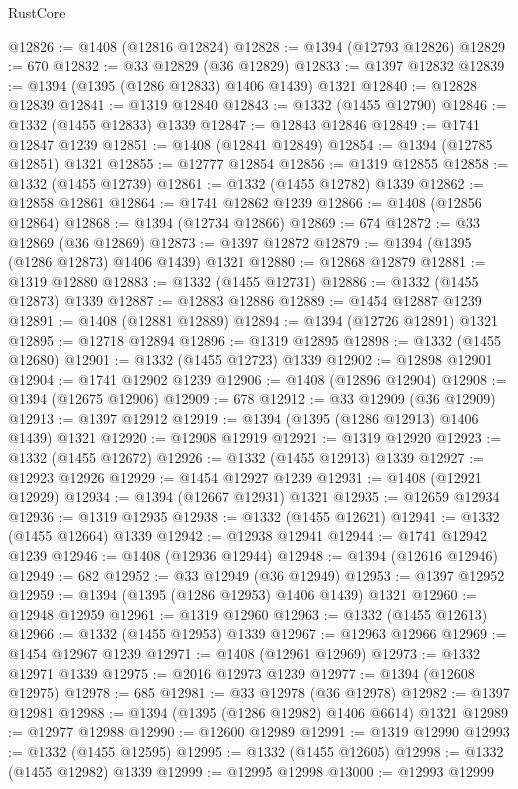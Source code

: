 \begin{lexlean}{RustCore}
\begin{coremodule}
@12826 := @1408 (@12816 @12824)
@12828 := @1394 (@12793 @12826)
@12829 := 670
@12832 := @33 @12829 (@36 @12829)
@12833 := @1397 @12832
@12839 := @1394 (@1395 (@1286 @12833) @1406 @1439) @1321
@12840 := @12828 @12839
@12841 := @1319 @12840
@12843 := @1332 (@1455 @12790)
@12846 := @1332 (@1455 @12833) @1339
@12847 := @12843 @12846
@12849 := @1741 @12847 @1239
@12851 := @1408 (@12841 @12849)
@12854 := @1394 (@12785 @12851) @1321
@12855 := @12777 @12854
@12856 := @1319 @12855
@12858 := @1332 (@1455 @12739)
@12861 := @1332 (@1455 @12782) @1339
@12862 := @12858 @12861
@12864 := @1741 @12862 @1239
@12866 := @1408 (@12856 @12864)
@12868 := @1394 (@12734 @12866)
@12869 := 674
@12872 := @33 @12869 (@36 @12869)
@12873 := @1397 @12872
@12879 := @1394 (@1395 (@1286 @12873) @1406 @1439) @1321
@12880 := @12868 @12879
@12881 := @1319 @12880
@12883 := @1332 (@1455 @12731)
@12886 := @1332 (@1455 @12873) @1339
@12887 := @12883 @12886
@12889 := @1454 @12887 @1239
@12891 := @1408 (@12881 @12889)
@12894 := @1394 (@12726 @12891) @1321
@12895 := @12718 @12894
@12896 := @1319 @12895
@12898 := @1332 (@1455 @12680)
@12901 := @1332 (@1455 @12723) @1339
@12902 := @12898 @12901
@12904 := @1741 @12902 @1239
@12906 := @1408 (@12896 @12904)
@12908 := @1394 (@12675 @12906)
@12909 := 678
@12912 := @33 @12909 (@36 @12909)
@12913 := @1397 @12912
@12919 := @1394 (@1395 (@1286 @12913) @1406 @1439) @1321
@12920 := @12908 @12919
@12921 := @1319 @12920
@12923 := @1332 (@1455 @12672)
@12926 := @1332 (@1455 @12913) @1339
@12927 := @12923 @12926
@12929 := @1454 @12927 @1239
@12931 := @1408 (@12921 @12929)
@12934 := @1394 (@12667 @12931) @1321
@12935 := @12659 @12934
@12936 := @1319 @12935
@12938 := @1332 (@1455 @12621)
@12941 := @1332 (@1455 @12664) @1339
@12942 := @12938 @12941
@12944 := @1741 @12942 @1239
@12946 := @1408 (@12936 @12944)
@12948 := @1394 (@12616 @12946)
@12949 := 682
@12952 := @33 @12949 (@36 @12949)
@12953 := @1397 @12952
@12959 := @1394 (@1395 (@1286 @12953) @1406 @1439) @1321
@12960 := @12948 @12959
@12961 := @1319 @12960
@12963 := @1332 (@1455 @12613)
@12966 := @1332 (@1455 @12953) @1339
@12967 := @12963 @12966
@12969 := @1454 @12967 @1239
@12971 := @1408 (@12961 @12969)
@12973 := @1332 @12971 @1339
@12975 := @2016 @12973 @1239
@12977 := @1394 (@12608 @12975)
@12978 := 685
@12981 := @33 @12978 (@36 @12978)
@12982 := @1397 @12981
@12988 := @1394 (@1395 (@1286 @12982) @1406 @6614) @1321
@12989 := @12977 @12988
@12990 := @12600 @12989
@12991 := @1319 @12990
@12993 := @1332 (@1455 @12595)
@12995 := @1332 (@1455 @12605)
@12998 := @1332 (@1455 @12982) @1339
@12999 := @12995 @12998
@13000 := @12993 @12999

\end{coremodule}
\end{lexlean}
